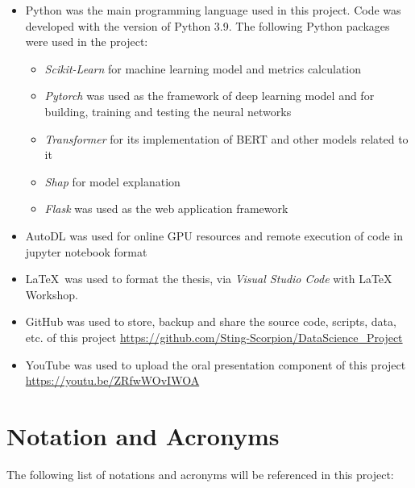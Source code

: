 \documentclass[ %
                    author={Bocheng Wang},
                supervisor={Dr. Qiang Liu},
                    degree={MSc},
                     title={A Research on Identification of Suicide Ideation in Texts with Multiple Models},
                      type={},
                      year={2024}]{dissertation}
\begin{document}
\begin{itemize}

\item Python was the main programming language used in this project. Code was developed with the version of Python 3.9. 
The following Python packages were used in the project:

\begin{itemize}
      \item {\em Scikit-Learn} for machine learning model and metrics calculation
      \item {\em Pytorch} was used as the framework of deep learning model and for building, training and testing the neural networks
      \item {\em Transformer} for its implementation of BERT and other models related to it
      \item {\em Shap} for model explanation
      \item {\em Flask} was used as the web application framework 
\end{itemize}

\item AutoDL was used for online GPU resources and remote execution of code in jupyter notebook format
 
\item \LaTeX\ was used to format the thesis, via {\em Visual Studio Code} with LaTeX Workshop. 

\item GitHub was used to store, backup and share the source code, scripts, data, etc. of this project
\url{https://github.com/Sting-Scorpion/DataScience_Project}

\item YouTube was used to upload the oral presentation component of this project
\url{https://youtu.be/ZRfwWOvIWOA}

\end{itemize}


\chapter*{Notation and Acronyms}
\noindent
The following list of notations and acronyms will be referenced in this project:
\end{document}
